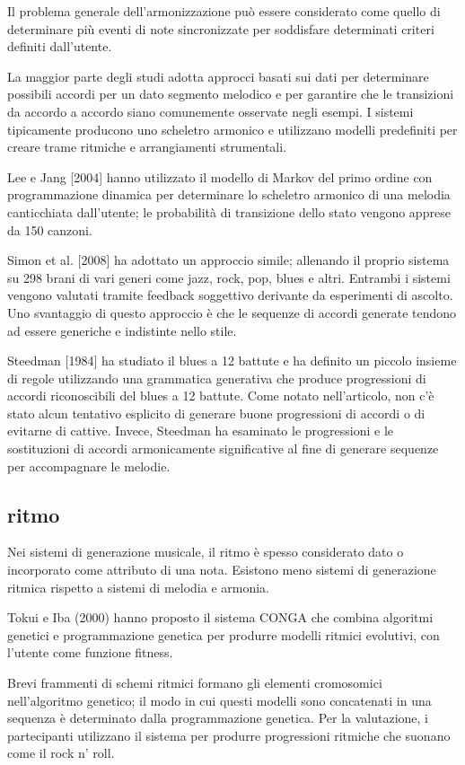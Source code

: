\documentclass[a4paper,12pt]{report}
\begin{document}
Il problema generale dell'armonizzazione può essere considerato come quello di determinare più eventi di note sincronizzate per soddisfare determinati criteri definiti dall'utente.

La maggior parte degli studi adotta approcci basati sui dati per determinare possibili accordi per un dato segmento melodico e per garantire che le transizioni da accordo a accordo siano comunemente osservate negli esempi.
I sistemi tipicamente producono uno scheletro armonico e utilizzano modelli predefiniti per creare trame ritmiche e arrangiamenti strumentali.

Lee e Jang [2004] hanno utilizzato il modello di Markov del primo ordine con programmazione dinamica per determinare lo scheletro armonico di una melodia canticchiata dall'utente; 
le probabilità di transizione dello stato vengono apprese da 150 canzoni. 

Simon et al. [2008] ha adottato un approccio simile; allenando il proprio sistema su 298 brani di vari generi come jazz, rock, pop, blues e altri. Entrambi i sistemi vengono valutati tramite feedback soggettivo derivante da esperimenti di ascolto. 
Uno svantaggio di questo approccio è che le sequenze di accordi generate tendono ad essere generiche e indistinte nello stile.

Steedman [1984] ha studiato il blues a 12 battute e ha definito un piccolo insieme di regole utilizzando una grammatica generativa che produce progressioni di accordi riconoscibili del blues a 12 battute. 
Come notato nell'articolo, non c'è stato alcun tentativo esplicito di generare buone progressioni di accordi o di evitarne di cattive. Invece, Steedman ha esaminato le progressioni e le sostituzioni di accordi armonicamente significative al fine di generare sequenze per accompagnare le melodie.


\subsection{ritmo}

Nei sistemi di generazione musicale, il ritmo è spesso considerato dato o incorporato come attributo di una nota. 
Esistono meno sistemi di generazione ritmica rispetto a sistemi di melodia e armonia.

Tokui e Iba (2000) hanno proposto il sistema CONGA che combina algoritmi genetici e programmazione genetica per produrre modelli ritmici evolutivi, con l'utente come funzione fitness.

Brevi frammenti di schemi ritmici formano gli elementi cromosomici nell'algoritmo genetico; il modo in cui questi modelli sono concatenati in una sequenza è determinato dalla programmazione genetica. 
Per la valutazione, i partecipanti utilizzano il sistema per produrre progressioni ritmiche che suonano come il rock n’ roll.
\end{document}
